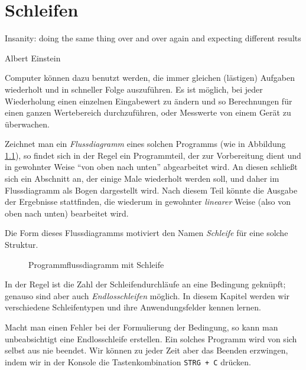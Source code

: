 \chapter{Schleifen}
\epigraph{
	Insanity: doing the same thing over and over again and expecting different results
}{Albert Einstein}

Computer können dazu benutzt werden, die immer gleichen (lästigen) Aufgaben wiederholt und in schneller Folge auszuführen. Es ist möglich, bei jeder Wiederholung einen einzelnen Eingabewert zu ändern und so \eg Berechnungen für einen ganzen Wertebereich durchzuführen, oder Messwerte von einem Gerät zu überwachen.

Zeichnet man ein \emph{Flussdiagramm} eines solchen Programms (wie in Abbildung \ref{fig:FlowBasicLoop}), so findet sich in der Regel ein Programmteil, der zur Vorbereitung dient und in gewohnter Weise \enquote{von oben nach unten} abgearbeitet wird. An diesen schließt sich ein Abschnitt an, der einige Male wiederholt werden soll, und daher im Flussdiagramm als Bogen dargestellt wird. Nach diesem Teil könnte die Ausgabe der Ergebnisse stattfinden, die wiederum in gewohnter \emph{linearer} Weise (also von oben nach unten) bearbeitet wird. 

Die Form dieses Flussdiagramms motiviert den Namen \emph{Schleife} für eine solche Struktur.

\begin{figure}[h!]
\begin{center}
\caption{Programmflussdiagramm mit Schleife} \label{fig:FlowBasicLoop}
\end{center}
\end{figure}

In der Regel ist die Zahl der Schleifendurchläufe an eine Bedingung geknüpft; genauso sind aber auch \emph{Endlosschleifen} möglich. In diesem Kapitel werden wir verschiedene Schleifentypen und ihre Anwendungsfelder kennen lernen.

\begin{hintbox}
Macht man einen Fehler bei der Formulierung der Bedingung, so kann man unbeabsichtigt eine Endlosschleife erstellen. Ein solches Programm wird von sich selbst aus nie beendet. Wir können zu jeder Zeit aber das Beenden erzwingen, indem wir in der Konsole die Tastenkombination \texttt{STRG + C} drücken.
\end{hintbox}

